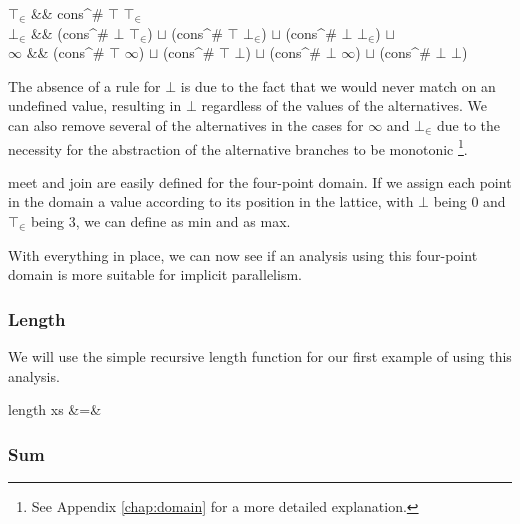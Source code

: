 \begin{haskell}
    \(\top_{\in}\) &\to& cons^{\#} \(\top\) \(\top_{\in}\)              \\  
    \(\bot_{\in}\) &\to& (cons^{\#} \(\bot\) \(\top_{\in}\)) \(\sqcup\)
                         (cons^{\#} \(\top\) \(\bot_{\in}\)) \(\sqcup\)
                         (cons^{\#} \(\bot\) \(\bot_{\in}\)) \(\sqcup\) \\  
    \(\infty\)     &\to& (cons^{\#} \(\top\) \(\infty\))     \(\sqcup\)
                         (cons^{\#} \(\top\) \(\bot\))       \(\sqcup\)
                         (cons^{\#} \(\bot\) \(\infty\))      \(\sqcup\)
                         (cons^{\#} \(\bot\) \(\bot\))
\end{haskell}

The absence of a rule for $\bot$ is due to the fact that we would never match
on an undefined value, resulting in $\bot$ regardless of the values of the
alternatives. We can also remove several of the alternatives in the cases for
$\infty$ and $\bot_{\in}$ due to the necessity for the abstraction of the
alternative branches to be monotonic \citep{wadler1987strictness}\footnote{See
Appendix \ref{chap:domain} for a more detailed explanation.}.



\<meet\> and \<join\> are easily defined for the four-point domain. If we
assign each point in the domain a value according to its position in the lattice,
with $\bot$ being $0$ and $\top_{\in}$ being $3$, we can define \meet as \<min\>
and \join as \<max\>.

With everything in place, we can now see if an analysis using this four-point
domain is more suitable for implicit parallelism.

\subsubsection{Length}

We will use the simple recursive \<length\> function for our first example of
using this analysis.

\begin{haskell*}
length xs &=& 
\end{haskell*}

\subsubsection{Sum}

